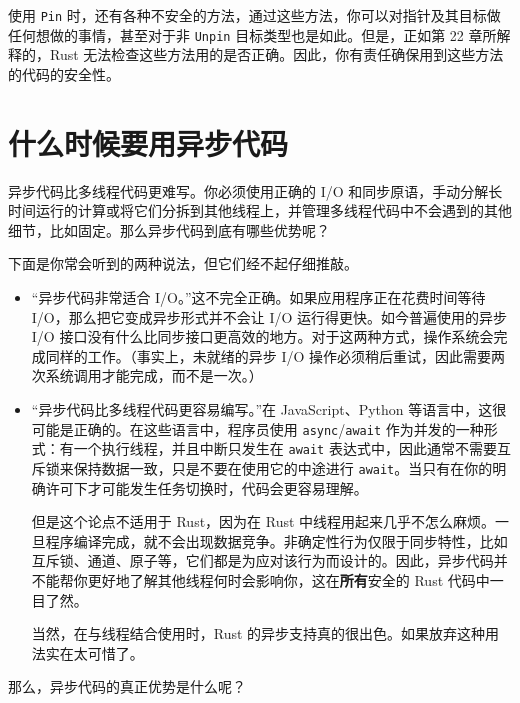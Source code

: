 使用 \texttt{Pin} 时，还有各种不安全的方法，通过这些方法，你可以对指针及其目标做任何想做的事情，甚至对于非 \texttt{Unpin} 目标类型也是如此。但是，正如第 22 章所解释的，Rust 无法检查这些方法用的是否正确。因此，你有责任确保用到这些方法的代码的安全性。

\section{什么时候要用异步代码}

异步代码比多线程代码更难写。你必须使用正确的 I/O 和同步原语，手动分解长时间运行的计算或将它们分拆到其他线程上，并管理多线程代码中不会遇到的其他细节，比如固定。那么异步代码到底有哪些优势呢？

下面是你常会听到的两种说法，但它们经不起仔细推敲。

\begin{itemize}
\item “异步代码非常适合 I/O。”这不完全正确。如果应用程序正在花费时间等待 I/O，那么把它变成异步形式并不会让 I/O 运行得更快。如今普遍使用的异步 I/O 接口没有什么比同步接口更高效的地方。对于这两种方式，操作系统会完成同样的工作。（事实上，未就绪的异步 I/O 操作必须稍后重试，因此需要两次系统调用才能完成，而不是一次。）
\item “异步代码比多线程代码更容易编写。”在 JavaScript、Python 等语言中，这很可能是正确的。在这些语言中，程序员使用 \texttt{async}/\texttt{await} 作为并发的一种形式：有一个执行线程，并且中断只发生在 \texttt{await} 表达式中，因此通常不需要互斥锁来保持数据一致，只是不要在使用它的中途进行 \texttt{await}。当只有在你的明确许可下才可能发生任务切换时，代码会更容易理解。

但是这个论点不适用于 Rust，因为在 Rust 中线程用起来几乎不怎么麻烦。一旦程序编译完成，就不会出现数据竞争。非确定性行为仅限于同步特性，比如互斥锁、通道、原子等，它们都是为应对该行为而设计的。因此，异步代码并不能帮你更好地了解其他线程何时会影响你，这在\textbf{所有}安全的 Rust 代码中一目了然。

当然，在与线程结合使用时，Rust 的异步支持真的很出色。如果放弃这种用法实在太可惜了。
\end{itemize}

那么，异步代码的真正优势是什么呢？

